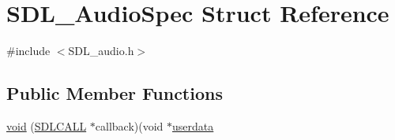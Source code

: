 \hypertarget{struct_s_d_l___audio_spec}{}\section{S\+D\+L\+\_\+\+Audio\+Spec Struct Reference}
\label{struct_s_d_l___audio_spec}


{\ttfamily \#include $<$S\+D\+L\+\_\+audio.\+h$>$}

\subsection*{Public Member Functions}
\begin{DoxyCompactItemize}
\item 
\hyperlink{struct_s_d_l___audio_spec_ab8a359069a60f225ab6e35a55dfb3d92}{void} (\hyperlink{begin__code_8h_a81faf4ba0455dc75f2e0507eddb79401}{S\+D\+L\+C\+A\+L\+L} $\ast$callback)(void $\ast$\hyperlink{struct_s_d_l___audio_spec_aeec9481666f5f0982c98d3878f175d9b}{userdata}
\end{DoxyCompactItemize}
